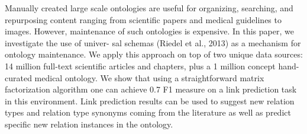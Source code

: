 Manually created large scale ontologies are useful for organizing, searching, and repurposing content ranging from scientific papers and medical guidelines to images. However, maintenance of such ontologies is expensive. In this paper, we investigate the use of univer- sal schemas (Riedel et al., 2013) as a mechanism for ontology maintenance. We apply this approach on top of two unique data sources: 14 million full-text scientific articles and chapters, plus a 1 million concept hand-curated medical ontology. We show that using a straightforward matrix factorization algorithm one can achieve 0.7 F1 measure on a link prediction task in this environment. Link prediction results can be used to suggest new relation types and relation type synonyms coming from the literature as well as predict specific new relation instances in the ontology.
